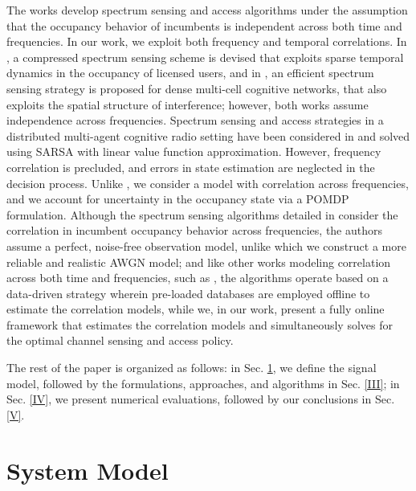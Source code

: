 \documentclass[10pt,twocolumn]{IEEEtran}
\begin{document}
The works \cite{7094730, 7895211} develop spectrum sensing and access algorithms under the assumption that the occupancy behavior of incumbents is independent across both time and frequencies. In our work, we exploit both frequency and temporal correlations. In \cite{7336513}, a compressed spectrum sensing scheme is devised that exploits sparse temporal dynamics in the occupancy of licensed users, and in \cite{8571293}, an efficient spectrum sensing strategy is proposed for dense multi-cell cognitive networks, that also exploits the spatial structure of interference; however, both works assume independence across frequencies. Spectrum sensing and access strategies in a distributed multi-agent cognitive radio setting have been considered in \cite{6507570} and solved using SARSA with linear value function approximation. However, frequency correlation is precluded, and errors in state estimation are neglected in the decision process. Unlike \cite{6507570}, we consider a model with correlation across frequencies, and we account for uncertainty in the occupancy state via a POMDP formulation. Although the spectrum sensing algorithms detailed in \cite{6956794} consider the correlation in incumbent occupancy behavior across frequencies, the authors assume a perfect, noise-free observation model, unlike which we construct a more reliable and realistic AWGN model; and like other works modeling correlation across both time and frequencies, such as \cite{4554696, 7032338}, the algorithms operate based on a  data-driven strategy wherein pre-loaded databases are employed offline to estimate the correlation models, while we, in our work, present a fully online framework that estimates the correlation models and simultaneously solves for the optimal channel sensing and access policy.

The rest of the paper is organized as follows: in Sec. \ref{II}, we define the signal model, followed by the formulations, approaches, and algorithms in Sec. \ref{III}; in Sec. \ref{IV}, we present numerical evaluations, followed by our conclusions in Sec. \ref{V}.
\section{System Model}\label{II}
\end{document}
